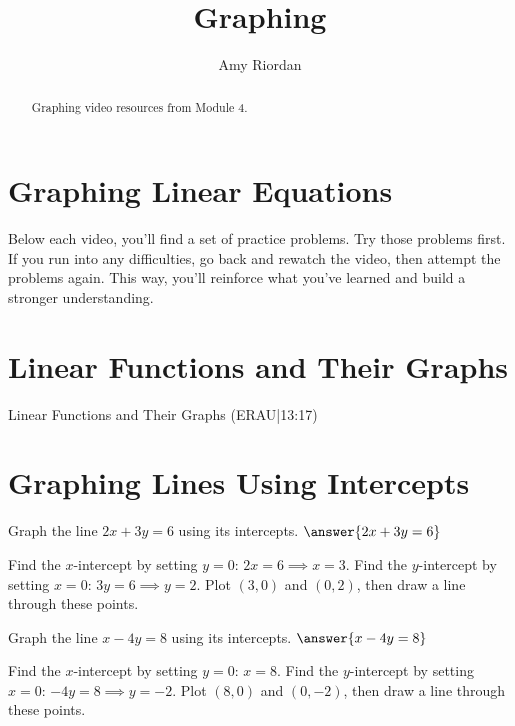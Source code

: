 \documentclass{ximera}
\title{Graphing}
\author{Amy Riordan}
\begin{document}
\begin{abstract}
Graphing video resources from Module 4.
\end{abstract}
\maketitle

\section*{Graphing Linear Equations}

Below each video, you’ll find a set of practice problems. Try those problems first. If you run into any difficulties, go back and rewatch the video, then attempt the problems again. This way, you’ll reinforce what you’ve learned and build a stronger understanding.

\section*{Linear Functions and Their Graphs}

Linear Functions and Their Graphs (ERAU|13:17)



\section*{Graphing Lines Using Intercepts}

\begin{problem}
Graph the line $2x + 3y = 6$ using its intercepts. $\answer{2x + 3y = 6}$
\begin{feedback}
Find the $x$-intercept by setting $y = 0$: $2x = 6 \implies x = 3$. Find the $y$-intercept by setting $x = 0$: $3y = 6 \implies y = 2$. Plot $(3, 0)$ and $(0, 2)$, then draw a line through these points.
\end{feedback}
\end{problem}

\begin{problem}
Graph the line $x - 4y = 8$ using its intercepts. $\answer{x - 4y = 8}$
\begin{feedback}
Find the $x$-intercept by setting $y = 0$: $x = 8$. Find the $y$-intercept by setting $x = 0$: $-4y = 8 \implies y = -2$. Plot $(8, 0)$ and $(0, -2)$, then draw a line through these points.
\end{feedback}
\end{problem}
\end{document}
